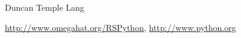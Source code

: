 \begin{Author}\relax
Duncan Temple Lang\end{Author}
\begin{References}\relax
\url{http://www.omegahat.org/RSPython},
\url{http://www.python.org}\end{References}
\begin{SeeAlso}\relax
{}
\end{SeeAlso}
\begin{Examples}
\begin{ExampleCode}
\end{ExampleCode}
\end{Examples}

